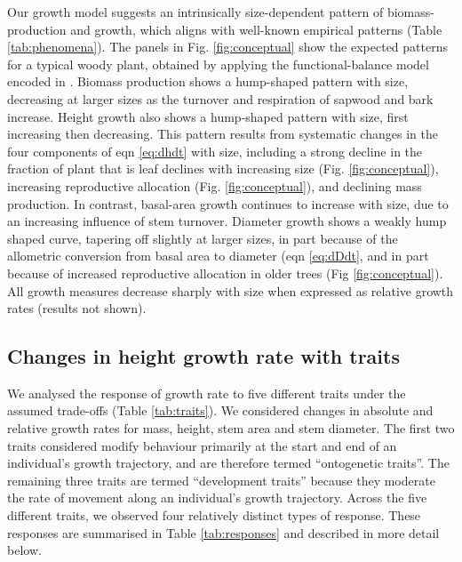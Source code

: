 \documentclass[a4paper,11pt]{article}
\begin{document}
Our growth model suggests an intrinsically size-dependent pattern of biomass-production and growth, which aligns with well-known empirical patterns (Table \ref{tab:phenomena}). The panels in Fig. \ref{fig:conceptual} show the expected patterns for a typical woody plant, obtained by applying the functional-balance model encoded in {\plant}. Biomass production shows a hump-shaped pattern with size, decreasing at larger sizes as the turnover and respiration of sapwood and bark increase. Height growth also shows a hump-shaped pattern with size, first increasing then decreasing. This pattern results from systematic changes in the four components of eqn \ref{eq:dhdt} with size, including a strong decline in the fraction of plant that is leaf declines with increasing size (Fig. \ref{fig:conceptual}), increasing reproductive allocation (Fig. \ref{fig:conceptual}), and declining mass production. In contrast, basal-area growth continues to increase with size, due to an increasing influence of stem turnover. Diameter growth shows a weakly hump shaped curve, tapering off slightly at larger sizes, in part because of the allometric conversion from basal area to diameter (eqn \ref{eq:dDdt}, and in part because of increased reproductive allocation in older trees (Fig \ref{fig:conceptual}). All growth measures decrease sharply with size when expressed as relative growth rates (results not shown).


\subsection{Changes in height growth rate with traits}

We analysed the response of growth rate to five different traits under the assumed trade-offs (Table \ref{tab:traits}). We considered changes in absolute and relative growth rates for mass, height, stem area and stem diameter. The first two traits considered modify behaviour primarily at the start and end of an individual's growth trajectory, and are therefore termed ``ontogenetic traits''. The remaining three traits are termed ``development traits'' because they moderate the rate of movement along an individual's growth trajectory. Across the five different traits, we observed four relatively distinct types of response. These responses are summarised in Table \ref{tab:responses} and described in more detail below.
\end{document}
